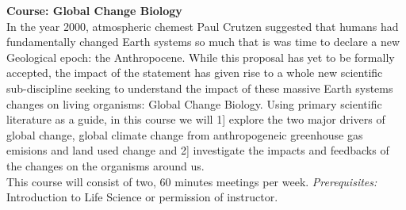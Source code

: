 \documentclass{article}\usepackage[]{graphicx}\usepackage[]{color}
\begin{document}
\textbf{Course: Global Change Biology}\\
\indent In the year 2000, atmospheric chemest Paul Crutzen suggested that humans had fundamentally changed Earth systems so much that is was time to declare a new Geological epoch: the Anthropocene. While this proposal has yet to be formally accepted, the impact of the statement has given rise to a whole new scientific sub-discipline seeking to understand the impact of these massive Earth systems changes on living organisms: Global Change Biology. Using primary scientific literature as a guide, in this course we will 1] explore the two major drivers of global change, global climate change from anthropogeneic greenhouse gas emisions and land used change and 2] investigate the impacts and feedbacks of the changes on the organisms around us.\\
\indent This course will consist of two, 60 minutes meetings per week. \textit{Prerequisites:} Introduction to Life Science or permission of instructor.\\
\end{document}

